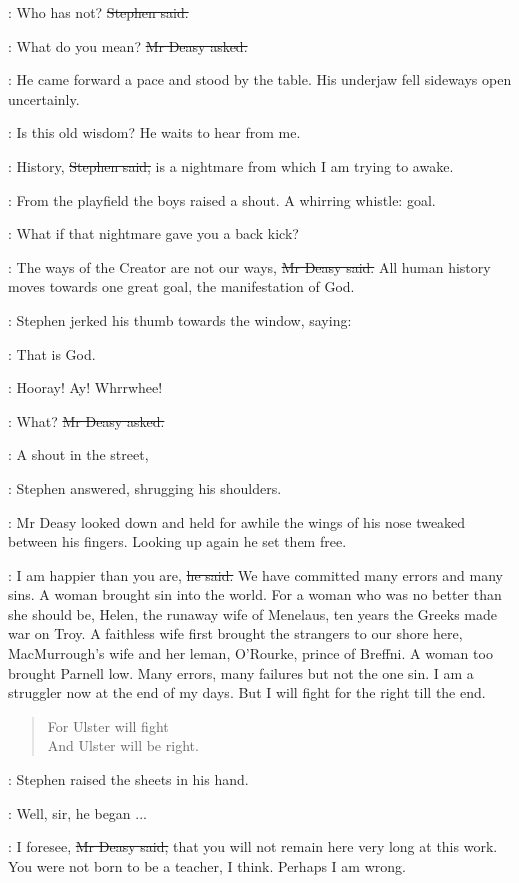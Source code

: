 \Stephen:
Who has not?
\sout{Stephen said.}

\deasy:
What do you mean?
\sout{Mr Deasy asked.}

:
He came forward a pace and stood by the table.
His underjaw fell sideways open uncertainly.

\StephenInt:
Is this old wisdom?
He waits to hear from me.

\Stephen:
History, \sout{Stephen said,}
is a nightmare from which I am trying to awake.

:
From the playfield the boys raised a shout.
A whirring whistle: goal.

\StephenInt:
What if that nightmare gave you a back kick?

\deasy:
The ways of the Creator are not our ways, \sout{Mr Deasy said.}
All human history moves towards one great goal,
the manifestation of God.

:
Stephen jerked his thumb towards the window, saying:

\Stephen:
That is God.

\All:
Hooray! Ay! Whrrwhee!

\deasy:
What?
\sout{Mr Deasy asked.}

\Stephen:
A shout in the street,

:
Stephen answered, shrugging his shoulders.

:
Mr Deasy looked down
and held for awhile the wings of his nose
tweaked between his fingers.
Looking up again he set them free.

\deasy:
I am happier than you are, \sout{he said.}
We have committed many errors and many sins.
A woman brought sin into the world.
For a woman who was no better than she should be,
Helen, the runaway wife of Menelaus,
ten years the Greeks made war on Troy.
A faithless wife first brought the strangers to our shore here,
MacMurrough's wife and her leman, O'Rourke, prince of Breffni.
A woman too brought Parnell low.
Many errors, many failures but not the one sin.
I am a struggler now at the end of my days.
But I will fight for the right till the end.

\begin{verse}
    For Ulster will fight \\
    And Ulster will be right.
\end{verse}

:
Stephen raised the sheets in his hand.

\Stephen:
Well, sir, he began ...

\deasy:
I foresee, \sout{Mr Deasy said,}
that you will not remain here very long at this work.
You were not born to be a teacher, I think.
Perhaps I am wrong.

